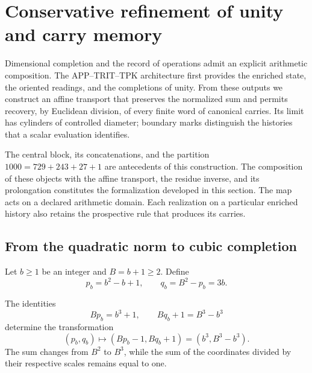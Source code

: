 \section{Conservative refinement of unity and carry memory}
\label{lib03:refinamiento}

Dimensional completion and the record of operations admit an explicit
arithmetic composition. The APP--TRIT--TPK architecture first provides
the enriched state, the oriented readings, and the
completions of unity. From these outputs we construct an
affine transport that preserves the normalized sum and permits recovery, by
Euclidean division, of every finite word of canonical carries. Its limit
has cylinders of controlled diameter; boundary marks distinguish
the histories that a scalar evaluation identifies.

The central block, its concatenations, and the partition
\(1000=729+243+27+1\) are antecedents of this construction. The composition
of these objects with the affine transport, the residue inverse, and its
prolongation constitutes the formalization developed in this section.
The map acts on a declared arithmetic domain. Each realization
on a particular enriched history also retains the
prospective rule that produces its carries.

\subsection{From the quadratic norm to cubic completion}
\label{lib03:completacion}

Let \(b\geq1\) be an integer and \(B=b+1\geq2\). Define
\begin{equation}
 p_b=b^2-b+1,\qquad q_b=B^2-p_b=3b.
 \label{lib03:pb}
\end{equation}

\begin{proposition}
\label{lib03:prop-completacion}
The identities
\begin{equation}
 Bp_b=b^3+1,\qquad Bq_b+1=B^3-b^3
 \label{lib03:cuadratica-cubica}
\end{equation}
determine the transformation
\begin{equation}
 (p_b,q_b)\longmapsto(Bp_b-1,Bq_b+1)
       =(b^3,B^3-b^3).
 \label{lib03:transferencia-cubica}
\end{equation}
The sum changes from \(B^2\) to \(B^3\), while the sum of the
coordinates divided by their respective scales remains equal to one.
\end{proposition}

